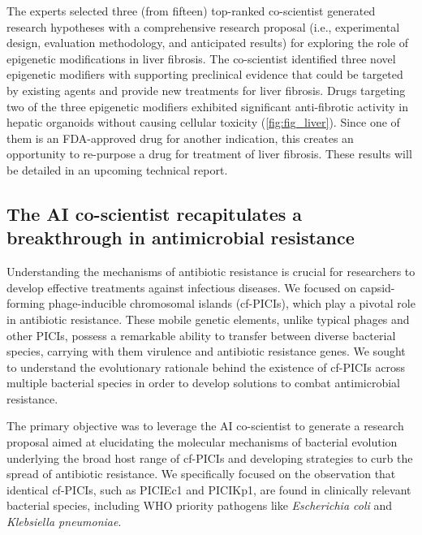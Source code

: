 The experts selected three (from fifteen) top-ranked co-scientist generated research hypotheses with a comprehensive research proposal (i.e., experimental design, evaluation methodology, and anticipated results) for exploring the role of epigenetic modifications in liver fibrosis. The co-scientist identified three novel epigenetic modifiers with supporting preclinical evidence that could be targeted by existing agents and provide new treatments for liver fibrosis. Drugs targeting two of the three epigenetic modifiers exhibited significant anti-fibrotic activity in hepatic organoids without causing cellular toxicity (\cref{fig:fig_liver}). Since one of them is an FDA-approved drug for another indication, this creates an opportunity to re-purpose a drug for treatment of liver fibrosis. These results will be detailed in an upcoming technical report.


\subsection{The AI co-scientist recapitulates a breakthrough in antimicrobial resistance}
\label{sec:result_amr}
Understanding the mechanisms of antibiotic resistance is crucial for researchers to develop effective treatments against infectious diseases. We focused on capsid-forming phage-inducible chromosomal islands (cf-PICIs), which play a pivotal role in antibiotic resistance. These mobile genetic elements, unlike typical phages and other PICIs, possess a remarkable ability to transfer between diverse bacterial species, carrying with them virulence and antibiotic resistance genes. We sought to understand the evolutionary rationale behind the existence of cf-PICIs across multiple bacterial species in order to develop solutions to combat antimicrobial resistance.

The primary objective was to leverage the AI co-scientist to generate a research proposal aimed at elucidating the molecular mechanisms of bacterial evolution underlying the broad host range of cf-PICIs and developing strategies to curb the spread of antibiotic resistance. We specifically focused on the observation that identical cf-PICIs, such as PICIEc1 and PICIKp1, are found in clinically relevant bacterial species, including WHO priority pathogens like \textit{Escherichia coli} and \textit{Klebsiella pneumoniae}.

